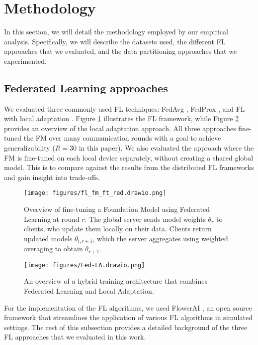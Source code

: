 \section{Methodology}
In this section, we will detail the methodology employed by our empirical analysis. 
Specifically, we will describe the datasets used, the different FL approaches that we evaluated, and the data partitioning approaches that we experimented.

\subsection{Federated Learning approaches}
We evaluated three commonly used FL techniques: FedAvg \cite{fl}, FedProx \cite{fedprox}, and FL with local adaptation \cite{yu2022salvagingfederatedlearninglocal}.
Figure \ref{figs:fedavg_overview} illustrates the FL framework, while Figure \ref{figs:fed_la_overview} provides an overview of the local adaptation approach.
All three approaches fine-tuned the FM over many communication rounds with a goal to achieve generalizability (\(R=30\) in this paper).
We also evaluated the approach where the FM is fine-tuned on each local device separately, without creating a shared global model.
This is to compare against the results from the distributed FL frameworks and gain insight into trade-offs.

\begin{figure}
  \texttt{[image: figures/fl\_fm\_ft\_red.drawio.png]}
  \caption{{Overview of fine-tuning a Foundation Model using Federated Learning at round \(r\). 
  The global server sends model weights \(\theta_r\) to clients, who update them locally on their data. 
  Clients return updated models \(\theta_{i,r+1}\), which the server aggregates using weighted averaging to obtain \(\theta_{r+1}\).
  }}
  \label{figs:fedavg_overview}
\end{figure}


\begin{figure}
  \texttt{[image: figures/Fed-LA.drawio.png]}
  \caption{{An overview of a hybrid training architecture that combines Federated Learning and Local Adaptation.
  }}
  \label{figs:fed_la_overview}
\end{figure}


For the implementation of the FL algorithms, we used FlowerAI \cite{flower-ai}, an open source framework that streamlines the application of various FL algorithms in simulated settings.
The rest of this subsection provides a detailed background of the three FL approaches that we evaluated in this work.

